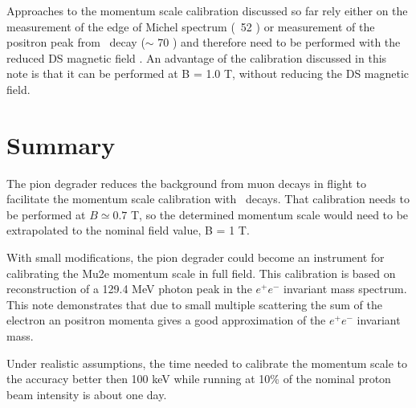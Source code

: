 \documentclass[12pt]{article}
\begin{document}
Approaches to the momentum scale calibration discussed so far rely either on the measurement
of the edge of Michel spectrum (~52 \MeVc) or measurement of the positron peak from
\piplusenu\ decay ($\sim$ 70 \MeVc) and therefore need to be performed with the reduced
DS magnetic field \cite{MU2E_48630_PIPLUSENU}.
An advantage of the calibration discussed in this note is that it can be performed
at B = 1.0 T, without reducing the DS magnetic field.








\section {Summary}

The pion degrader reduces the background from muon decays in flight to facilitate
the momentum scale calibration with \piplusenu\ decays. That calibration needs to
be performed at $B \simeq 0.7$ T, so the determined momentum scale would need to be
extrapolated to the nominal field value, B = 1 T.

With small modifications, the pion degrader could become an instrument
for calibrating the Mu2e momentum scale in full field. This calibration is based on
reconstruction of a 129.4 MeV photon peak in the $e^+e^-$ invariant mass spectrum.
%
This note demonstrates that due to small multiple scattering the sum of the
electron an positron momenta gives a good approximation of the $e^+e^-$ invariant mass.

Under realistic assumptions, the time needed to calibrate the momentum scale
to the accuracy better then 100 keV while running at 10\% of the nominal proton beam
intensity is about one day.


%
\newpage



% 

\end{document}
